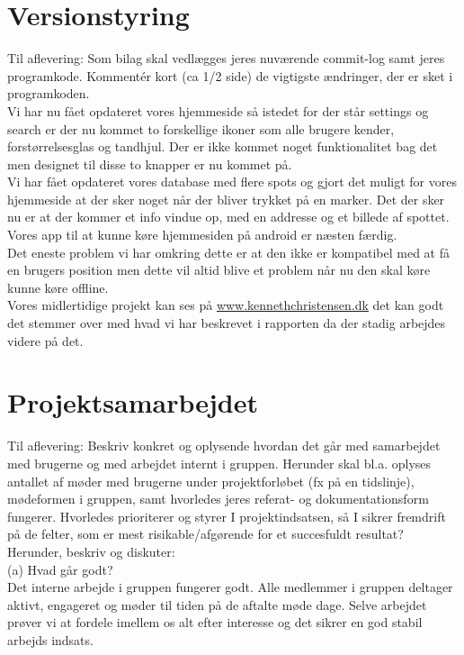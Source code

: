 \documentclass[12pt]{article}
\begin{document}
\pagebreak
\section{Versionstyring}
Til aflevering: Som bilag skal vedlægges jeres nuværende commit-log samt jeres
programkode. Kommentér kort (ca 1/2 side) de vigtigste ændringer, der er sket i programkoden.\\

Vi har nu fået opdateret vores hjemmeside så istedet for der står settings og search er der nu kommet to forskellige ikoner som alle brugere kender, forstørrelsesglas og tandhjul. Der er ikke kommet noget funktionalitet bag det men designet til disse to knapper er nu kommet på. \\
Vi har fået opdateret vores database med flere spots og gjort det muligt for vores hjemmeside at der sker noget når der bliver trykket på en marker. Det der sker nu er at der kommer et info vindue op, med en addresse og et billede af spottet.\\
Vores app til at kunne køre hjemmesiden på android er næsten færdig.\\
Det eneste problem vi har omkring dette er at den ikke er kompatibel med at få en brugers position men dette vil altid blive et problem når nu den skal køre kunne køre offline.\\
Vores midlertidige projekt kan ses på \url{www.kennethchristensen.dk} det kan godt det stemmer over med hvad vi har beskrevet i rapporten da der stadig arbejdes videre på det.\\

\pagebreak
\section{Projektsamarbejdet}
Til aflevering: Beskriv konkret og oplysende hvordan det går med samarbejdet med brugerne
og med arbejdet internt i gruppen. Herunder skal bl.a. oplyses antallet af møder med brugerne under
projektforløbet (fx på en tidslinje), mødeformen i gruppen, samt hvorledes jeres referat- og
dokumentationsform fungerer. Hvorledes prioriterer og styrer I projektindsatsen, så I sikrer
fremdrift på de felter, som er mest risikable/afgørende for et succesfuldt resultat? Herunder, beskriv
og diskuter:\\

(a) Hvad går godt?\\
Det interne arbejde i gruppen fungerer godt. Alle medlemmer i gruppen deltager aktivt, engageret og møder til tiden på de aftalte møde dage. Selve arbejdet prøver vi at fordele imellem os alt efter interesse og det sikrer en god stabil arbejds indsats.\\
\end{document}
